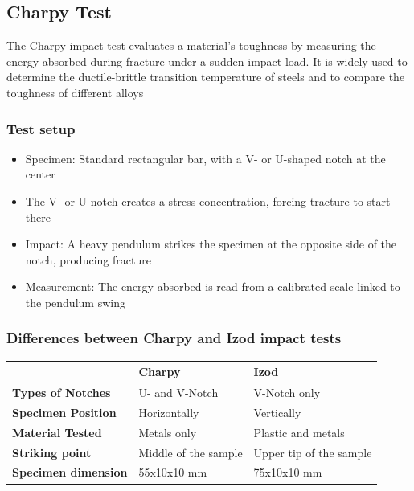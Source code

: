\documentclass{article}
\begin{document}
\subsection{Charpy Test}
The Charpy impact test evaluates a material's toughness by measuring the energy absorbed
during fracture under a sudden impact load. It is widely used to determine the
ductile-brittle transition temperature of steels and to compare the toughness of different
alloys

\subsubsection{Test setup}
\begin{itemize}
  \item Specimen: Standard rectangular bar, with a V- or U-shaped notch at the center
  \item The V- or U-notch creates a stress concentration, forcing tracture to start there
  \item Impact: A heavy pendulum strikes the specimen at the opposite side of the notch, producing fracture
  \item Measurement: The energy absorbed is read from a calibrated scale linked to the pendulum swing
\end{itemize}

\subsubsection{Differences between Charpy and Izod impact tests}
\begin{table}[h!]
  \centering
  \begin{tabular}{|l|l|l|}
    \hline
    & \textbf{Charpy} & \textbf{Izod}\\
    \hline
    \textbf{Types of Notches} & U- and V-Notch & V-Notch only\\
    \hline
    \textbf{Specimen Position} & Horizontally & Vertically\\
    \hline
    \textbf{Material Tested} & Metals only & Plastic and metals\\
    \hline
    \textbf{Striking point} & Middle of the sample & Upper tip of the sample\\
    \hline
    \textbf{Specimen dimension} & 55x10x10 mm & 75x10x10 mm\\
    \hline
  \end{tabular}
\end{table}

\newpage
\end{document}
